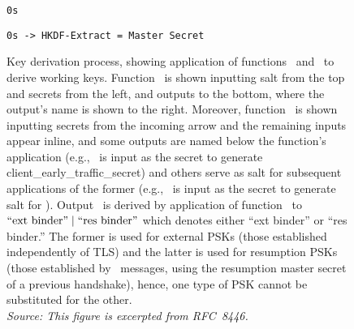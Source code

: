 \begin{figure}
\begin{lstlisting}[belowskip=0pt,numbers=none,frame=none,nolol=true]
             0s
\end{lstlisting}
%

%
\begin{lstlisting}[aboveskip=0pt,belowskip=0pt,numbers=none,frame=none,nolol=true]
  0s -> HKDF-Extract = Master Secret
\end{lstlisting}
%


\caption[Key derivation process]{
  Key derivation process, showing application of functions \HKDFExtract\ and \DeriveSecret\
  to derive working keys. Function \HKDFExtract\ is shown inputting salt from 
  the top and secrets from the left, and outputs to the bottom, where the output's name 
  is shown to the right. Moreover, function \DeriveSecret\ is shown inputting secrets from the 
  incoming arrow and the remaining inputs appear inline, and some outputs are named below 
  the function's application (e.g., \TLSEarlySecret\ is input as the secret to generate
  \textrm{client\_early\_traffic\_secret}) and others serve as salt for subsequent 
  applications of the former (e.g., \TLSEarlySecret\ is input as the secret to 
  generate salt for \TLSHandshakeSecret). Output \TLSbinderKey\ is derived
  by application of function \DeriveSecret\ to 
  $``\textrm{ext binder}" \mid ``\textrm{res binder}"$ which denotes either 
  ``\textrm{ext binder}'' or ``\textrm{res binder}.'' The former is used for external 
  PSKs (those established independently of TLS) and the latter is used for resumption 
  PSKs (those established by \NewSessionTicket\ messages, using the resumption master 
  secret of a previous handshake), hence, one type of PSK cannot be substituted for the 
  other.\\
  \emph{Source: This figure is excerpted from RFC~8446.}
}
\label{fig:keyDerivation}
\end{figure}

